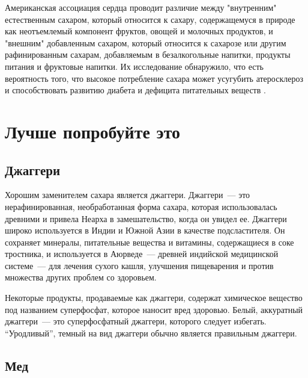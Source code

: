 Американская ассоциация сердца проводит различие между "внутренним" естественным сахаром, который относится к сахару, содержащемуся в природе как неотъемлемый компонент фруктов, овощей и молочных продуктов, и "внешним" добавленным сахаром, который относится к сахарозе или другим рафинированным сахарам, добавляемым в безалкогольные напитки, продукты питания и фруктовые напитки. Их исследование обнаружило, что есть вероятность того, что высокое потребление сахара может усугубить атеросклероз и способствовать развитию диабета и дефицита питательных веществ \cite{SugarCardiovascular}.

\section*{Лучше попробуйте это}
\subsection{Джаггери}
Хорошим заменителем сахара является джаггери. Джаггери~--- это нерафинированная, необработанная форма сахара, которая использовалась древними и привела Неарха в замешательство, когда он увидел ее. Джаггери широко используется в Индии и Южной Азии в качестве подсластителя. Он сохраняет минералы, питательные вещества и витамины, содержащиеся в соке тростника, и используется в Аюрведе~--- древней индийской медицинской системе~--- для лечения сухого кашля, улучшения пищеварения и против множества других проблем со здоровьем.

\begin{KeepInMind}
Некоторые продукты, продаваемые как джаггери, содержат химическое вещество под названием суперфосфат, которое наносит вред здоровью. Белый, аккуратный джаггери~--- это суперфосфатный джаггери, которого следует избегать. “Уродливый”, темный на вид джаггери обычно является правильным джаггери.
\end{KeepInMind}

\subsection{Мед}


